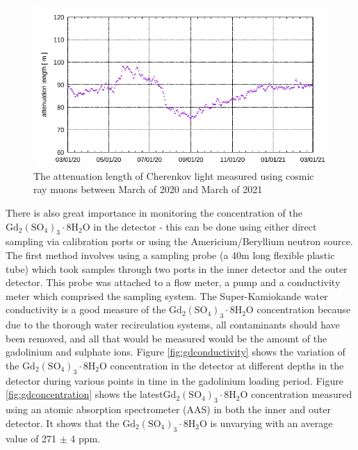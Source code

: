 \begin{figure}[H]
    \includegraphics[width=\textwidth]{Figures/attenuation_length_gd.png}
    \caption{The attenuation length of Cherenkov light measured using cosmic ray muons between March of 2020 and March of 2021}
    \label{fig:gdattenuationlength}
\end{figure}



There is also great importance in monitoring the concentration of the $\mathrm{Gd}_{2}\left(\mathrm{SO}_{4}\right)_{3} \cdot 8 \mathrm{H}_{2} \mathrm{O}$ in the detector - this can be done using either direct sampling via calibration ports or using the Americium/Beryllium neutron source. The first method involves using a sampling probe (a 40m long flexible plastic tube) which took samples through two ports in the inner detector and the outer detector. This probe was attached to a flow meter, a pump and a conductivity meter which comprised the sampling system. The Super-Kamiokande water conductivity is a good measure of the  $\mathrm{Gd}_{2}\left(\mathrm{SO}_{4}\right)_{3} \cdot 8 \mathrm{H}_{2} \mathrm{O}$ concentration because due to the thorough water recirculation systems, all contaminants should have been removed, and all that would be measured would be the amount of the gadolinium and sulphate ions. Figure \ref{fig:gdconductivity} shows the variation of the $\mathrm{Gd}_{2}\left(\mathrm{SO}_{4}\right)_{3} \cdot 8 \mathrm{H}_{2} \mathrm{O}$ concentration in the detector at different depths in the detector during various points in time in the gadolinium loading period. Figure \ref{fig:gdconcentration} shows the latest$\mathrm{Gd}_{2}\left(\mathrm{SO}_{4}\right)_{3} \cdot 8 \mathrm{H}_{2} \mathrm{O}$  concentration measured using an atomic absorption spectrometer (AAS) in both the inner and outer detector. It shows that the $\mathrm{Gd}_{2}\left(\mathrm{SO}_{4}\right)_{3} \cdot 8 \mathrm{H}_{2} \mathrm{O}$ is unvarying with an average value of 271 $\pm$ 4 ppm. 


